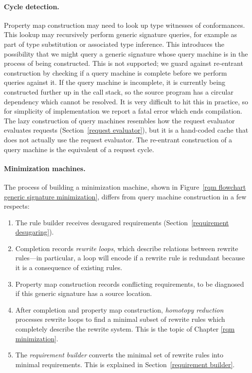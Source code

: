 \documentclass[../generics]{subfiles}
\begin{document}
\paragraph{Cycle detection.}
Property map construction may need to look up type witnesses of conformances. This lookup may recursively perform generic signature queries, for example as part of type substitution or associated type inference. This introduces the possibility that we might query a generic signature whose query machine is in the process of being constructed. This is not supported; we guard against re-entrant construction by checking if a query machine is complete before we perform queries against it. If the query machine is incomplete, it is currently being constructed further up in the call stack, so the source program has a circular dependency which cannot be resolved. It is very difficult to hit this in practice, so for simplicity of implementation we report a fatal error which ends compilation. The lazy construction of query machines resembles how the request evaluator evaluates requests (Section~\ref{request evaluator}), but it is a hand-coded cache that does not actually use the request evaluator. The re-entrant construction of a query machine is the equivalent of a request cycle.

\paragraph{Minimization machines.}
The process of building a minimization machine, shown in Figure~\ref{rqm flowchart generic signature minimization}, differs from query machine construction in a few respects:
\begin{enumerate}
\item The rule builder receives desugared requirements (Section~\ref{requirement desugaring}).
\item Completion records \emph{rewrite loops}, which describe relations between rewrite rules---in particular, a loop will encode if a rewrite rule is redundant because it is a consequence of existing rules.
\item Property map construction records conflicting requirements, to be diagnosed if this generic signature has a source location.
\item After completion and property map construction, \emph{homotopy reduction} processes rewrite loops to find a minimal subset of rewrite rules which completely describe the rewrite system. This is the topic of Chapter \ref{rqm minimization}.
\item The \emph{requirement builder} converts the minimal set of rewrite rules into minimal requirements. This is explained in Section~\ref{requirement builder}.
\end{enumerate}
\end{document}
